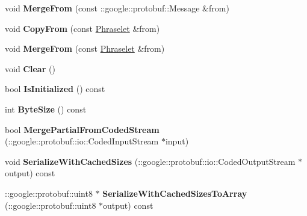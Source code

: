 \begin{DoxyCompactItemize}
\item 
\hypertarget{classlattice_1_1Phraselet_a381bcf822ebd538c59bf795dee2b77d9}{
void {\bfseries MergeFrom} (const ::google::protobuf::Message \&from)}
\label{classlattice_1_1Phraselet_a381bcf822ebd538c59bf795dee2b77d9}

\item 
\hypertarget{classlattice_1_1Phraselet_aa8bc3ab3f900bfdff4a4134031218fc3}{
void {\bfseries CopyFrom} (const \hyperlink{classlattice_1_1Phraselet}{Phraselet} \&from)}
\label{classlattice_1_1Phraselet_aa8bc3ab3f900bfdff4a4134031218fc3}

\item 
\hypertarget{classlattice_1_1Phraselet_aea4c86bf72b788b9afec402442f963df}{
void {\bfseries MergeFrom} (const \hyperlink{classlattice_1_1Phraselet}{Phraselet} \&from)}
\label{classlattice_1_1Phraselet_aea4c86bf72b788b9afec402442f963df}

\item 
\hypertarget{classlattice_1_1Phraselet_a380c5bf45d45269bc0ec61e80c4df34e}{
void {\bfseries Clear} ()}
\label{classlattice_1_1Phraselet_a380c5bf45d45269bc0ec61e80c4df34e}

\item 
\hypertarget{classlattice_1_1Phraselet_aa25d46e3d15cb431d4a7cf30c8ad5bdb}{
bool {\bfseries IsInitialized} () const }
\label{classlattice_1_1Phraselet_aa25d46e3d15cb431d4a7cf30c8ad5bdb}

\item 
\hypertarget{classlattice_1_1Phraselet_a6b23edd221a64e6553d042f45df86e73}{
int {\bfseries ByteSize} () const }
\label{classlattice_1_1Phraselet_a6b23edd221a64e6553d042f45df86e73}

\item 
\hypertarget{classlattice_1_1Phraselet_af794c511c8d6be67e141a790ce18ef6f}{
bool {\bfseries MergePartialFromCodedStream} (::google::protobuf::io::CodedInputStream $\ast$input)}
\label{classlattice_1_1Phraselet_af794c511c8d6be67e141a790ce18ef6f}

\item 
\hypertarget{classlattice_1_1Phraselet_a00627ab143b2b8d5fcbdc686b2496230}{
void {\bfseries SerializeWithCachedSizes} (::google::protobuf::io::CodedOutputStream $\ast$output) const }
\label{classlattice_1_1Phraselet_a00627ab143b2b8d5fcbdc686b2496230}

\item 
\hypertarget{classlattice_1_1Phraselet_ac1261f6fa5635a6dc867b5afcbbce2c0}{
::google::protobuf::uint8 $\ast$ {\bfseries SerializeWithCachedSizesToArray} (::google::protobuf::uint8 $\ast$output) const }
\label{classlattice_1_1Phraselet_ac1261f6fa5635a6dc867b5afcbbce2c0}


\end{DoxyCompactItemize}

